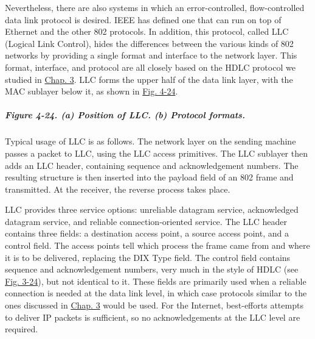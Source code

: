 \documentclass[b5paper,11pt]{memoir}
\begin{document}
Nevertheless, there are also systems in which an error-controlled,
flow-controlled data link protocol is desired. IEEE has defined one that
can run on top of Ethernet and the other 802 protocols. In addition,
this protocol, called {LLC} ({Logical Link Control}), hides the
differences between the various kinds of 802 networks by providing a
single format and interface to the network layer. This format,
interface, and protocol are all closely based on the HDLC protocol we
studied in \protect\hyperlink{0130661023_ch03.htmlux5cux23ch03}{Chap.
3}. LLC forms the upper half of the data link layer, with the MAC
sublayer below it, as shown in
\protect\hyperlink{0130661023_ch04lev1sec3.htmlux5cux23ch04fig24}{Fig.
4-24}.

\subparagraph[Figure 4-24. (a) Position of LLC. (b) Protocol
formats.]{\texorpdfstring{\protect\hypertarget{0130661023_ch04lev1sec3.htmlux5cux23ch04fig24}{}{}Figure
4-24. (a) Position of LLC. (b) Protocol
formats.}{Figure 4-24. (a) Position of LLC. (b) Protocol formats.}}


Typical usage of LLC is as follows. The network layer on the sending
machine passes a packet to LLC, using the LLC access primitives. The LLC
sublayer then adds an LLC header, containing sequence and
acknowledgement numbers. The resulting structure is then inserted into
the payload field of an 802 frame and transmitted. At the receiver, the
reverse process takes place.

LLC provides three service options: unreliable datagram service,
acknowledged datagram service, and reliable connection-oriented service.
The LLC header contains three fields: a destination access point, a
source access point, and a control field. The access points tell which
process the frame came from and where it is to be delivered, replacing
the DIX {Type} field. The control field contains sequence and
acknowledgement numbers, very much in the style of HDLC (see
\protect\hyperlink{0130661023_ch03lev1sec6.htmlux5cux23ch03fig24}{Fig.
3-24}), but not identical to it. These fields are primarily used when a
reliable connection is needed at the data link level, in which case
protocols similar to the ones discussed in
\protect\hyperlink{0130661023_ch03.htmlux5cux23ch03}{Chap. 3} would be
used. For the Internet, best-efforts attempts to deliver IP packets is
sufficient, so no acknowledgements at the LLC level are required.

\protect\hypertarget{0130661023_ch04lev1sec3.htmlux5cux23ch04lev2sec18}{}{}
\end{document}
